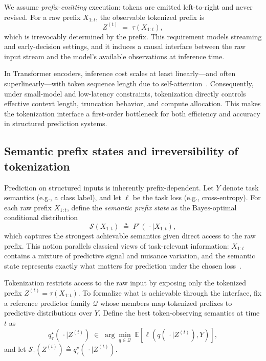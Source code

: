 We assume \emph{prefix-emitting} execution: tokens are emitted left-to-right and never revised.
For a raw prefix $X_{1:t}$, the observable tokenized prefix is
\begin{equation}
Z^{(t)} \;=\; \tau(X_{1:t}),
\label{eq:bg_prefix}
\end{equation}
which is irrevocably determined by the prefix.
This requirement models streaming and early-decision settings, and it induces a causal interface between the
raw input stream and the model's available observations at inference time.

In Transformer encoders, inference cost scales at least linearly—and often superlinearly—with token
sequence length due to self-attention~\cite{vaswani2017attention,kaplan2020scaling}.
Consequently, under small-model and low-latency constraints, tokenization directly controls effective context
length, truncation behavior, and compute allocation.
This makes the tokenization interface a first-order bottleneck for both efficiency and accuracy in structured
prediction systems.

\subsection{Semantic prefix states and irreversibility of tokenization}
\label{sec:bg_semantics}

Prediction on structured inputs is inherently prefix-dependent.
Let $Y$ denote task semantics (e.g., a class label), and let $\ell$ be the task loss (e.g., cross-entropy).
For each raw prefix $X_{1:t}$, define the \emph{semantic prefix state} as the Bayes-optimal conditional
distribution
\begin{equation}
\mathcal{S}(X_{1:t})
\;\triangleq\;
P^\star(\,\cdot \mid X_{1:t}),
\label{eq:semantic_state_raw}
\end{equation}
which captures the strongest achievable semantics given direct access to the raw prefix.
This notion parallels classical views of task-relevant information: $X_{1:t}$ contains a mixture of
predictive signal and nuisance variation, and the semantic state represents exactly what matters for prediction
under the chosen loss~\cite{tishby2000information,cover1999elements}.

Tokenization restricts access to the raw input by exposing only the tokenized prefix
$Z^{(t)} = \tau(X_{1:t})$.
To formalize what is achievable through the interface, fix a reference predictor family $\mathcal{Q}$ whose
members map tokenized prefixes to predictive distributions over $Y$.
Define the best token-observing semantics at time $t$ as
\begin{equation}
q^\star_\tau(\,\cdot \mid Z^{(t)})
\;\in\;
\arg\min_{q \in \mathcal{Q}}
\;
\mathbb{E}\!\left[\ell\!\left(q(\,\cdot \mid Z^{(t)}), Y\right)\right],
\label{eq:semantic_state_token}
\end{equation}
and let $\mathcal{S}_\tau(Z^{(t)}) \triangleq q^\star_\tau(\,\cdot \mid Z^{(t)})$.

